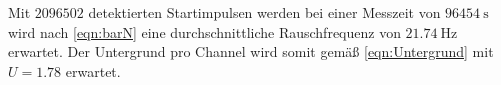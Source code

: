 Mit $2096502$ detektierten Startimpulsen werden bei einer Messzeit von $\SI{96454}{\second}$ wird nach \eqref{eqn:barN} eine durchschnittliche Rauschfrequenz von $\SI{21.74}{\hertz}$ erwartet. Der Untergrund pro Channel wird somit gemäß \eqref{eqn:Untergrund} mit $U = 1.78$ erwartet.





